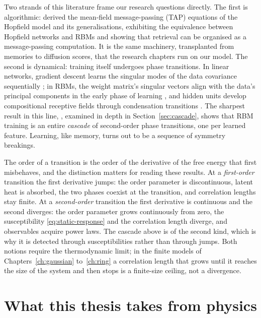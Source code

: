 Two strands of this literature frame our research questions directly.
The first is algorithmic: \citet{mezard2017meanfield} derived the
mean-field message-passing (TAP) equations of the Hopfield model and its
generalisations, exhibiting the equivalence between Hopfield networks and
RBMs and showing that retrieval can be organised as a message-passing
computation. It is the same machinery, transplanted from memories to
diffusion scores, that the research chapters run on our model. The second
is dynamical: training itself undergoes phase transitions. In linear
networks, gradient descent learns the singular modes of the data
covariance sequentially \citep{saxe2014exact}; in RBMs, the weight
matrix's singular vectors align with the data's principal components in
the early phase of learning \citep{decelle2017spectral}, and hidden units
develop compositional receptive fields through condensation transitions
\citep{tubiana2017emergence}. The sharpest result in this line,
\citet{bachtis2024cascade}, examined in depth in
Section~\ref{sec:cascade}, shows that RBM training is an entire
\emph{cascade} of second-order phase transitions, one per learned
feature. Learning, like memory, turns out to be a sequence of symmetry
breakings.

The order of a transition is the order of the derivative of the free energy
that first misbehaves, and the distinction matters for reading these results.
At a \emph{first-order} transition the first derivative jumps: the order
parameter is discontinuous, latent heat is absorbed, the two phases coexist at
the transition, and correlation lengths stay finite. At a \emph{second-order}
transition the first derivative is continuous and the second diverges: the
order parameter grows continuously from zero, the susceptibility
\eqref{eq:static-response} and the correlation length diverge, and observables
acquire power laws. The cascade above is of the second kind, which is why it is
detected through susceptibilities rather than through jumps. Both notions
require the thermodynamic limit; in the finite models of
Chapters~\ref{ch:gaussian} to~\ref{ch:ring} a correlation length that grows
until it reaches the size of the system and then stops is a finite-size
ceiling, not a divergence.

\section{What this thesis takes from physics}

